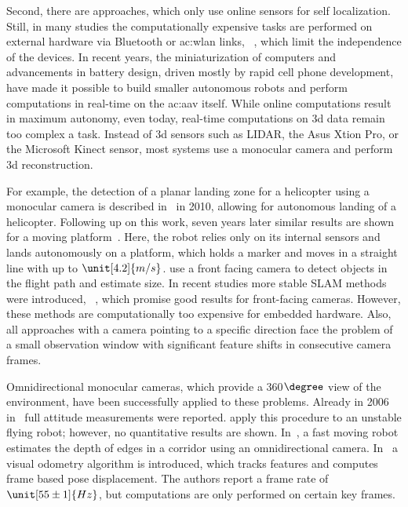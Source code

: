 Second, there are approaches, which only use online sensors for self localization.
Still, in many studies the computationally expensive tasks are performed on external hardware via Bluetooth or \gls{ac:wlan} links, \eg~\cite{engel14ras,zhang2016controllable}, which limit the independence of the devices.
In recent years, the miniaturization of computers and advancements in battery design, driven mostly by rapid cell phone development, have made it possible to build smaller autonomous robots and perform computations in real-time on the \gls{ac:aav} itself.
While online computations result in maximum autonomy, even today, real-time computations on 3d data remain too complex a task.
Instead of 3d sensors such as LIDAR, the Asus Xtion Pro, or the Microsoft Kinect sensor, most systems use a monocular camera and perform 3d reconstruction.

For example, the detection of a planar landing zone for a helicopter using a monocular camera is described in~\cite{5584396} in 2010, allowing for autonomous landing of a helicopter.
Following up on this work, seven years later similar results are shown for a moving platform~\cite{falanga2017vision}.
Here, the robot relies only on its internal sensors and lands autonomously on a platform, which holds a marker and moves in a straight line with up to $\unit[4.2]{m/s}$.
\cite{6630807} use a front facing camera to detect objects in the flight path and estimate size.
In recent studies more stable SLAM methods were introduced, \eg~\cite{7219438,engel2014lsd,engel2017direct}, which promise good results for front-facing cameras.
However, these methods are computationally too expensive for embedded hardware.
Also, all approaches with a camera pointing to a specific direction face the problem of a small observation window with significant feature shifts in consecutive camera frames.

Omnidirectional monocular cameras, which provide a 360$\degree$ view of the environment, have been successfully applied to these problems.
Already in 2006 in~\cite{demonceaux2006omnidirectional} full attitude measurements were reported.
\cite{rodriguez2012real} apply this procedure to an unstable flying robot; however, no quantitative results are shown.
In~\cite{lukierski2017room}, a fast moving robot estimates the depth of edges in a corridor using an omnidirectional camera.
In~\cite{forster2014svo} a visual odometry algorithm is introduced, which tracks features and computes frame based pose displacement.
The authors report a frame rate of $\unit[55 \pm 1]{Hz}$, but computations are only performed on certain key frames.


